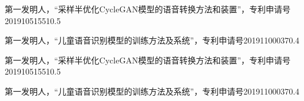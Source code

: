 

\begin{patents}
  \item 第一发明人，“采样半优化CycleGAN模型的语音转换方法和装置”，专利申请号201910515510.5
  \item 第一发明人，“儿童语音识别模型的训练方法及系统”，专利申请号201911000370.4
\end{patents}

\begin{patents*}
  \item 第一发明人，“采样半优化CycleGAN模型的语音转换方法和装置”，专利申请号201910515510.5
  \item 第一发明人，“儿童语音识别模型的训练方法及系统”，专利申请号201911000370.4
\end{patents*}

